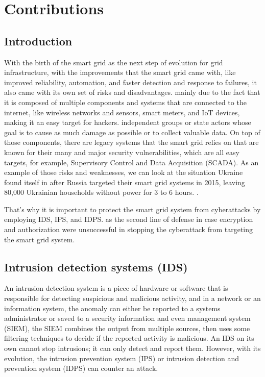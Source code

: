 \chapter{Contributions} \label{chap:Contributions}


\section*{Introduction}
With the birth of the smart grid as the next step of evolution for grid infrastructure, with the improvements that the smart grid came with, like improved reliability, automation, and faster detection and response to failures, it also came with its own set of risks and disadvantages. mainly due to the fact that it is composed of multiple components and systems that are connected to the internet, like wireless networks and sensors, smart meters, and IoT devices, making it an easy target for hackers. independent groups or state actors whose goal is to cause as much damage as possible or to collect valuable data. On top of those components, there are legacy systems that the smart grid relies on that are known for their many and major security vulnerabilities, which are all easy targets, for example, Supervisory Control and Data Acquisition (SCADA). As an example of those risks and weaknesses, we can look at the situation Ukraine found itself in after Russia targeted their smart grid systems in 2015, leaving 80,000 Ukrainian households without power for 3 to 6 hours. \cite{ukrain-sg-attack}.

That's why it is important to protect the smart grid system from cyberattacks by employing IDS, IPS, and IDPS. 
as the second line of defense in case encryption and authorization were unsuccessful in stopping the cyberattack from targeting the smart grid system.

\newpage




\section{Intrusion detection systems (IDS)}
An intrusion detection system is a piece of hardware or software that is responsible for detecting suspicious and malicious activity, and in a network or an information system, the anomaly can either be reported to a systems administrator or saved to a security information and even management system (SIEM), the SIEM combines the output from multiple sources, then uses some filtering techniques to decide if the reported activity is malicious. \cite{ids-def}
An IDS on its own cannot stop intrusions; it can only detect and report them. However, with its evolution, the intrusion prevention system (IPS) or intrusion detection and prevention system (IDPS) can counter an attack. \cite{ibm-ids}








